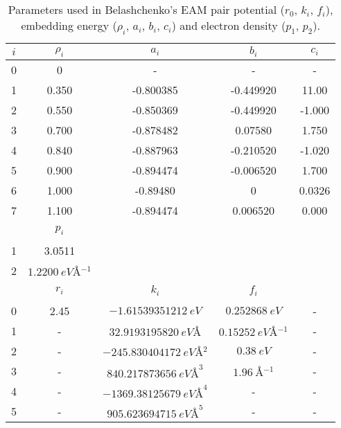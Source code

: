 \documentclass[jcp,amsmath,amssymb,preprint]{revtex4-1}
\begin{document}
\begin{table}[]
    \centering
    \begin{tabular}{c|cccc}
         \hline \hline
         $i$ & $\rho_i$ & $a_i$ & $b_i$ & $c_i$ \\\hline
         0 & 0 & - & - & - \\
         1 & 0.350 & -0.800385 & -0.449920 & 11.00 \\
         2 & 0.550 & -0.850369 & -0.449920 & -1.000 \\
         3 & 0.700 & -0.878482 & 0.07580 & 1.750 \\
         4 & 0.840 & -0.887963 & -0.210520 & -1.020 \\
         5 & 0.900 & -0.894474 & -0.006520 & 1.700 \\
         6 & 1.000 & -0.89480 & 0 & 0.0326 \\
         7 & 1.100 & -0.894474 & 0.006520 & 0.000 \\ \hline
        \hline
        ~ & $p_i$ \\\hline
        1 & 3.0511 \\
        2 & $\SI{1.2200}{eV \angstrom^{-1}}$\\ \hline
        \hline
        ~ & $r_i$ & $k_i$ & $f_i$ \\\hline
        0 & 2.45 & $\SI{-1.61539351212}{eV}$ & $\SI{0.252868}{eV}$ & - \\
        1 & - & $\SI{32.9193195820}{eV\angstrom}$ & $\SI{0.15252}{eV \angstrom^{-1}}$ & - \\
        2 & - & $\SI{-245.830404172}{eV\angstrom^2}$ & $\SI{0.38}{eV}$ & - \\
        3 & - & $\SI{840.217873656}{eV\angstrom}^3$ & $\SI{1.96}{\angstrom^{-1}}$ & - \\
        4 & - & $\SI{-1369.38125679}{eV\angstrom}^4$ & - & - \\
        5 & - & $\SI{905.623694715}{eV\angstrom}^5$ & - & - \\\hline\hline
    \end{tabular}
    \caption{Parameters used in Belashchenko's EAM pair potential ($r_0$, $k_i$, $f_i$), embedding energy ($\rho_i$, $a_i$, $b_i$, $c_i$) and electron density ($p_1$, $p_2$)\cite{belashchenko2012embedded}.}
    \label{tab:BEAM}
\end{table}
\end{document}
